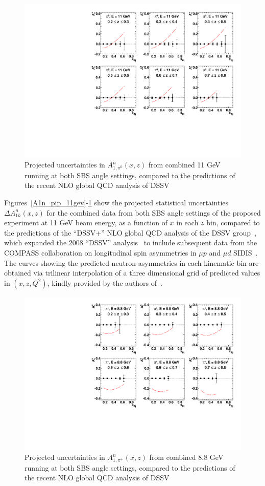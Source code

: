 \begin{figure}[h]
  \begin{center}
    \includegraphics[width=.75\textwidth]{figures/A1n_vs_x_E11_pi0.pdf}
  \end{center}
  \caption{\label{A1n_pi0_11gev} Projected uncertainties in $A_{1,\pi^0}^{n}(x,z)$ from combined 11 GeV running at both SBS angle settings, compared to the predictions of the recent NLO global QCD analysis of DSSV~\cite{DSSVplus}}
\end{figure}
Figures~\ref{A1n_pip_11gev}-\ref{A1n_pi0_11gev} show the projected statistical uncertainties $\Delta A_{1h}^{n}(x,z)$ for the combined data from both SBS angle settings of the proposed experiment at 11 GeV beam energy, as a function of $x$ in each $z$ bin, compared to the predictions of the ``DSSV+'' NLO global QCD analysis of the DSSV group~\cite{DSSVplus}, which expanded the 2008 ``DSSV'' analysis~\cite{DSSV2008,DSSV2009} to include subsequent data from the COMPASS collaboration on longitudinal spin asymmetries in $\mu p$ and $\mu d$ SIDIS~\cite{COMPASS_d_2009,COMPASS_d_p_2010}. The curves showing the predicted neutron asymmetries in each kinematic bin are obtained via trilinear interpolation of a three dimensional grid of predicted values in $(x,z,Q^2)$, kindly provided by the authors of~\cite{DSSVplus}.

\begin{figure}[h]
  \begin{center}
    \includegraphics[width=.75\textwidth]{figures/A1n_vs_x_E88_pip.pdf}
  \end{center}
  \caption{\label{A1n_pip_88gev} Projected uncertainties in $A_{1,\pi^+}^{n}(x,z)$ from combined 8.8 GeV running at both SBS angle settings, compared to the predictions of the recent NLO global QCD analysis of DSSV~\cite{DSSVplus}}
\end{figure}

